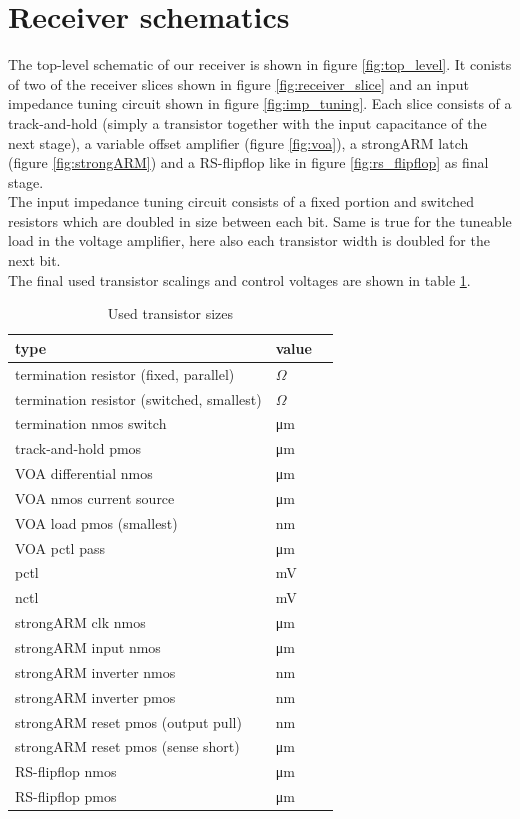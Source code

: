 \section{Receiver schematics}
\label{sec:rx_schematics}

The top-level schematic of our receiver is shown in figure \ref{fig:top_level}. It conists of two of the receiver slices shown in figure \ref{fig:receiver_slice} and an input impedance tuning circuit shown in figure \ref{fig:imp_tuning}. Each slice consists of a track-and-hold (simply a transistor together with the input capacitance of the next stage), a variable offset amplifier (figure \ref{fig:voa}), a strongARM latch (figure \ref{fig:strongARM}) and a RS-flipflop like in figure \ref{fig:rs_flipflop} as final stage.\\
The input impedance tuning circuit consists of a fixed portion and switched resistors which are doubled in size between each bit. Same is true for the tuneable load in the voltage amplifier, here also each transistor width is doubled for the next bit.\\
The final used transistor scalings and control voltages are shown in table \ref{tab:scaling}.

\begin{table}[H]
  \centering
  \begin{tabular}{l|l|l}
    type & value\\
    \hline
    termination resistor (fixed, parallel) & \unit[131]{$\Omega$}\\
    termination resistor (switched, smallest) & \unit[220]{$\Omega$}\\
    termination nmos switch & \unit[20]{\um}\\
    \hline
    track-and-hold pmos & \unit[20]{\um}\\
    \hline
    VOA differential nmos & \unit[2]{\um}\\
    VOA nmos current source & \unit[16]{\um}\\
    VOA load pmos (smallest) & \unit[400]{nm}\\
    VOA pctl pass & \unit[10]{\um}\\
    pctl & \unit[757]{mV}\\
    nctl & \unit[320]{mV}\\
    \hline
    strongARM clk nmos & \unit[2]{\um}\\
    strongARM input nmos & \unit[2]{\um}\\
    strongARM inverter nmos & \unit[300]{nm}\\
    strongARM inverter pmos & \unit[600]{nm}\\
    strongARM reset pmos (output pull) & \unit[750]{nm}\\
    strongARM reset pmos (sense short) & \unit[1]{\um}\\
    \hline
    RS-flipflop nmos & \unit[2]{\um}\\
    RS-flipflop pmos & \unit[2]{\um}\\
  \end{tabular}
  \caption{Used transistor sizes}
  \label{tab:scaling}
\end{table}

